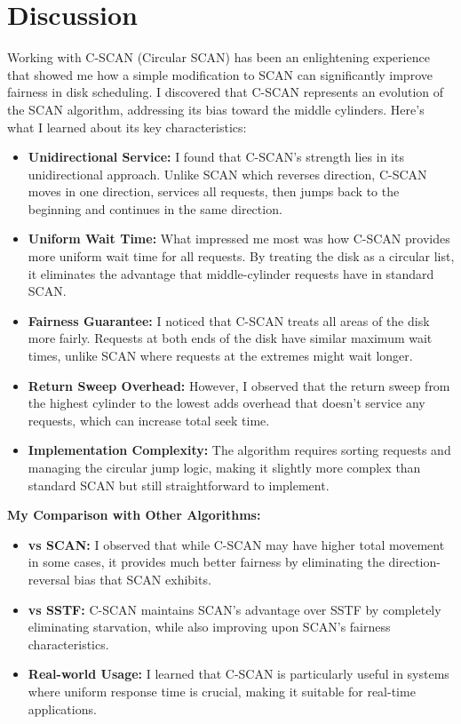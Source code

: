 \documentclass[12pt,a4paper]{article}
\begin{document}
\section{Discussion}
Working with C-SCAN (Circular SCAN) has been an enlightening experience that showed me how a simple modification to SCAN can significantly improve fairness in disk scheduling. I discovered that C-SCAN represents an evolution of the SCAN algorithm, addressing its bias toward the middle cylinders. Here's what I learned about its key characteristics:

\begin{itemize}
    \item \textbf{Unidirectional Service:} I found that C-SCAN's strength lies in its unidirectional approach. Unlike SCAN which reverses direction, C-SCAN moves in one direction, services all requests, then jumps back to the beginning and continues in the same direction.
    \item \textbf{Uniform Wait Time:} What impressed me most was how C-SCAN provides more uniform wait time for all requests. By treating the disk as a circular list, it eliminates the advantage that middle-cylinder requests have in standard SCAN.
    \item \textbf{Fairness Guarantee:} I noticed that C-SCAN treats all areas of the disk more fairly. Requests at both ends of the disk have similar maximum wait times, unlike SCAN where requests at the extremes might wait longer.
    \item \textbf{Return Sweep Overhead:} However, I observed that the return sweep from the highest cylinder to the lowest adds overhead that doesn't service any requests, which can increase total seek time.
    \item \textbf{Implementation Complexity:} The algorithm requires sorting requests and managing the circular jump logic, making it slightly more complex than standard SCAN but still straightforward to implement.
\end{itemize}

\textbf{My Comparison with Other Algorithms:}
\begin{itemize}
    \item \textbf{vs SCAN:} I observed that while C-SCAN may have higher total movement in some cases, it provides much better fairness by eliminating the direction-reversal bias that SCAN exhibits.
    \item \textbf{vs SSTF:} C-SCAN maintains SCAN's advantage over SSTF by completely eliminating starvation, while also improving upon SCAN's fairness characteristics.
    \item \textbf{Real-world Usage:} I learned that C-SCAN is particularly useful in systems where uniform response time is crucial, making it suitable for real-time applications.
\end{itemize}
\end{document}
